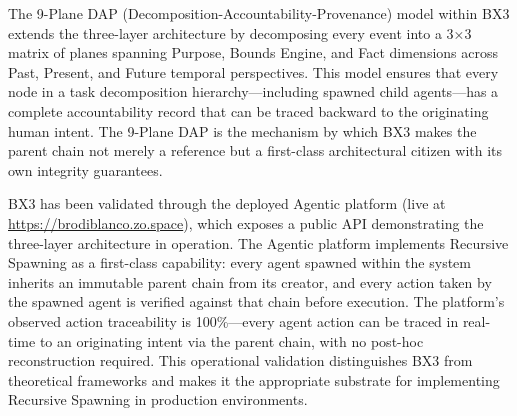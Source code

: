 The 9-Plane DAP (Decomposition-Accountability-Provenance) model within BX3 extends the three-layer architecture by decomposing every event into a 3×3 matrix of planes spanning Purpose, Bounds Engine, and Fact dimensions across Past, Present, and Future temporal perspectives. This model ensures that every node in a task decomposition hierarchy—including spawned child agents—has a complete accountability record that can be traced backward to the originating human intent. The 9-Plane DAP is the mechanism by which BX3 makes the parent chain not merely a reference but a first-class architectural citizen with its own integrity guarantees.

BX3 has been validated through the deployed Agentic platform (live at \url{https://brodiblanco.zo.space}), which exposes a public API demonstrating the three-layer architecture in operation. The Agentic platform implements Recursive Spawning as a first-class capability: every agent spawned within the system inherits an immutable parent chain from its creator, and every action taken by the spawned agent is verified against that chain before execution. The platform's observed action traceability is 100\%—every agent action can be traced in real-time to an originating intent via the parent chain, with no post-hoc reconstruction required. This operational validation distinguishes BX3 from theoretical frameworks and makes it the appropriate substrate for implementing Recursive Spawning in production environments.




